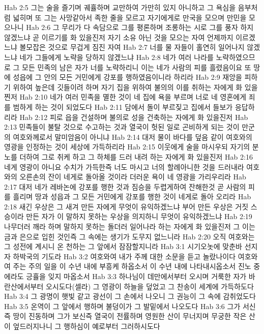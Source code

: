 Hab 2:5  그는 술을 즐기며 궤휼하며 교만하여 가만히 있지 아니하고 그 욕심을 음부처럼 넓히며 또 그는 사망같아서 족한 줄을 모르고 자기에게로 만국을 모으며 만민을 모으나니
Hab 2:6  그 무리가 다 속담으로 그를 평론하며 조롱하는 시로 그를 풍자 하지 않겠느냐 곧 이르기를 화 있을진저 자기 소유 아닌 것을 모으는 자여 언제까지 이르겠느냐 볼모잡은 것으로 무겁게 짐진 자여
Hab 2:7  너를 물 자들이 홀연히 일어나지 않겠느냐 네가 그들에게 노략을 당하지 않겠느냐
Hab 2:8  네가 여러 나라를 노략하였으므로 그 모든 민족의 남은 자가 너를 노략하리니 이는 네가 사람의 피를 흘렸음이요 또 땅에 성읍에 그 안의 모든 거민에게 강포를 행하였음이니라 하리라
Hab 2:9  재앙을 피하기 위하여 높은데 깃들이려 하며 자기 집을 위하여 불의의 이를 취하는 자에게 화 있을찐저
Hab 2:10  네가 여러 민족을 멸한 것이 네 집에 욕을 부르며 너로 네 영혼에게 죄를 범하게 하는 것이 되었도다
Hab 2:11  담에서 돌이 부르짖고 집에서 들보가 응답하리라
Hab 2:12  피로 읍을 건설하며 불의로 성을 건축하는 자에게 화 있을진저
Hab 2:13  민족들이 불탈 것으로 수고하는 것과 열국이 헛된 일로 곤비하게 되는 것이 만군의 여호와께로서 말미암음이 아니냐
Hab 2:14  대저 물이 바다를 덮음 같이 여호와의 영광을 인정하는 것이 세상에 가득하리라
Hab 2:15  이웃에게 술을 마시우되 자기의 분노를 더하여 그로 취케 하고 그 하체를 드러 내려 하는 자에게 화 있을진저
Hab 2:16  네게 영광이 아니요 수치가 가득한즉 너도 마시고 너의 할례아니한 것을 드러내라 여호와의 오른손의 잔이 네게로 돌아올 것이라 더러운 욕이 네 영광을 가리우리라
Hab 2:17  대저 네가 레바논에 강포를 행한 것과 짐승을 두렵게하여 잔해한것 곧 사람의 피를 흘리며 땅과 성읍과 그 모든 거민에게 강포를 행한 것이 네게로 돌아 오리라
Hab 2:18  새긴 우상은 그 새겨 만든 자에게 무엇이 유익하겠느냐 부어 만든 우상은 거짓 스승이라 만든 자가 이 말하지 못하는 우상을 의지하니 무엇이 유익하겠느냐
Hab 2:19  나무더러 깨라 하며 말하지 못하는 돌더러 일어나라 하는 자에게 화 있을진저 그 이는 금과 은으로 입힌 것인즉 그 속에는 생기가 도무지 없느니라
Hab 2:20  오직 여호와는 그 성전에 계시니 온 천하는 그 앞에서 잠잠할지니라
Hab 3:1  시기오놋에 맞춘바 선지자 하박국의 기도라
Hab 3:2  여호와여 내가 주께 대한 소문을 듣고 놀랐나이다 여호와여 주는 주의 일을 이 수년 내에 부흥케 하옵소서 이 수년 내에 나타내시옵소서 진노 중에라도 긍휼을 잊지 마옵소서
Hab 3:3  하나님이 데만에서부터 오시며 거룩한 자가 바란산에서부터 오시도다(셀라) 그 영광이 하늘을 덮었고 그 찬송이 세계에 가득하도다
Hab 3:4  그 광명이 햇빛 같고 광선이 그 손에서 나오니 그 권능이 그 속에 감취었도다
Hab 3:5  온역이 그 앞에서 행하며 불덩이가 그 발밑에서 나오도다
Hab 3:6  그가 서신즉 땅이 진동하며 그가 보신즉 열국이 전률하며 영원한 산이 무너지며 무궁한 작은 산이 엎드러지나니 그 행하심이 예로부터 그러하시도다
